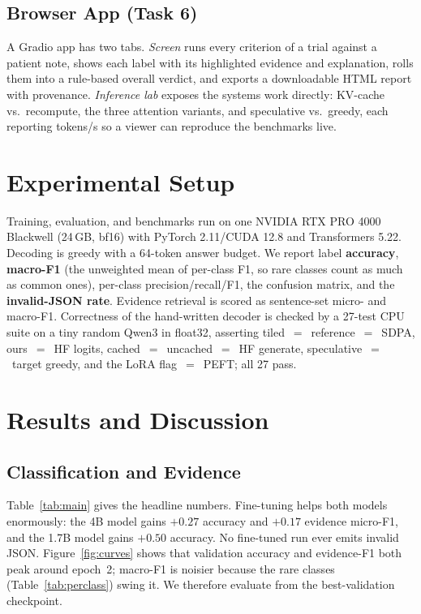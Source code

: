 \documentclass[conference]{IEEEtran}
\begin{document}
\subsection{Browser App (Task 6)}
\label{sec:app}
A Gradio app has two tabs. \emph{Screen} runs every criterion of a trial against a
patient note, shows each label with its highlighted evidence and explanation,
rolls them into a rule-based overall verdict, and exports a downloadable HTML
report with provenance. \emph{Inference lab} exposes the systems work directly:
KV-cache vs.\ recompute, the three attention variants, and speculative vs.\ greedy,
each reporting tokens/s so a viewer can reproduce the benchmarks live.

\section{Experimental Setup}
\label{sec:setup}
Training, evaluation, and benchmarks run on one NVIDIA RTX PRO 4000 Blackwell
(24\,GB, bf16) with PyTorch 2.11/CUDA 12.8 and Transformers 5.22. Decoding is
greedy with a 64-token answer budget. We report label \textbf{accuracy},
\textbf{macro-F1} (the unweighted mean of per-class F1, so rare classes count as
much as common ones), per-class precision/recall/F1, the confusion matrix, and
the \textbf{invalid-JSON rate}. Evidence retrieval is scored as sentence-set
micro- and macro-F1. Correctness of the hand-written decoder is checked by a
27-test CPU suite on a tiny random Qwen3 in float32, asserting
tiled~$=$~reference~$=$~SDPA, ours~$=$~HF logits, cached~$=$~uncached~$=$~HF
generate, speculative~$=$~target greedy, and the LoRA flag~$=$~PEFT; all 27 pass.

\section{Results and Discussion}
\label{sec:results}

\subsection{Classification and Evidence}
Table~\ref{tab:main} gives the headline numbers. Fine-tuning helps both models
enormously: the 4B model gains $+0.27$ accuracy and $+0.17$ evidence micro-F1, and
the 1.7B model gains $+0.50$ accuracy. No fine-tuned run ever emits invalid JSON.
Figure~\ref{fig:curves} shows that validation accuracy and evidence-F1 both peak
around epoch~2; macro-F1 is noisier because the rare classes (Table~\ref{tab:perclass})
swing it. We therefore evaluate from the best-validation checkpoint.
\end{document}

